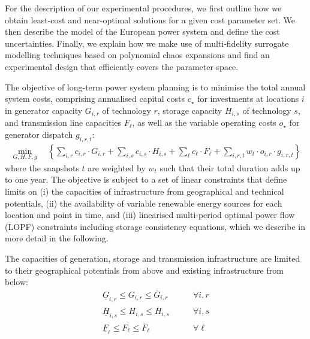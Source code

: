 For the description of our experimental procedures, we first outline how we
obtain least-cost and near-optimal solutions for a given cost parameter set. We
then describe the model of the European power system and define the cost
uncertainties. Finally, we explain how we make use of multi-fidelity surrogate
modelling techniques based on polynomial chaos expansions and find an
experimental design that efficiently covers the parameter space.


The objective of long-term power system planning is to minimise the total
annual system costs, comprising annualised capital costs $c_\star$ for investments at locations $i$
in generator capacity $G_{i,r}$ of technology $r$, storage capacity $H_{i,s}$ of technology $s$, and transmission line capacities
$F_{\ell}$, as well as the variable operating costs $o_\star$ for generator dispatch $g_{i,r,t}$:
\begin{align}
    \min_{G,H,F,g} \quad \left\{
        \sum_{i,r}   c_{i,r}  \cdot G_{i,r}  +
        \sum_{i,s}   c_{i,s}  \cdot H_{i,s}  +
        \sum_{\ell}  c_{\ell} \cdot F_{\ell} +
        \sum_{i,r,t} w_t \cdot o_{i,r} \cdot g_{i,r,t}
    \right\}
    \label{eq:objective}
\end{align}
where the snapshots $t$ are weighted by $w_t$ such that their total duration
adds up to one year. The objective is subject to a set of linear constraints that define limits on
(i) the capacities of infrastructure from geographical and technical potentials,
(ii) the availability of variable renewable energy sources for each location and point in time, and
(iii) linearised multi-period optimal power flow (LOPF) constraints including storage consistency equations,
which we describe in more detail in the following.

The capacities of generation, storage and transmission infrastructure are
limited to their geographical potentials from above and existing infrastructure from below:
\begin{align}
    \label{eq:firstA}
    \underline{G}_{i,r}  \leq G_{i,r}  \leq \overline{G}_{i,r}  &\qquad\forall i, r \\
    \underline{H}_{i,s}  \leq H_{i,s}  \leq \overline{H}_{i,s}  &\qquad\forall i, s \\
    \underline{F}_{\ell} \leq F_{\ell} \leq \overline{F}_{\ell} &\qquad\forall \ell
\end{align}

